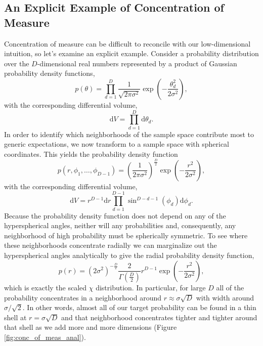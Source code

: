 \documentclass[11pt, oneside]{article}
\newcommand{\dd}{ \mathrm{d} }
\begin{document}
\subsection{An Explicit Example of Concentration of Measure}

Concentration of measure can be difficult to reconcile with our
low-dimensional intuition, so let's examine an explicit example.  Consider 
a probability distribution over the $D$-dimensional real numbers 
represented by a product of Gaussian probability density functions,
%
\begin{equation*}
p \! \left( \theta \right) = 
\prod_{d = 1}^{D} \frac{1}{\sqrt{2 \pi \sigma^{2} } }
\exp \! \left( - \frac{\theta_{d}^{2}}{2 \sigma^{2}} \right),
\end{equation*}
%
with the corresponding differential volume,
%
\begin{equation*}
\dd V = \prod_{d = 1}^{D} \dd \theta_{d}.
\end{equation*}
%
In order to identify which neighborhoods of the sample space contribute
most to generic expectations, we now transform to a sample space with 
spherical coordinates.  This yields the probability density function
%
\begin{equation*}
p \! \left( r, \phi_{1}, \ldots, \phi_{D - 1} \right) = 
\left( \frac{1}{2 \pi \sigma^{2} } \right)^{\frac{D}{2}}
\exp \! \left( - \frac{r^{2}}{2 \sigma^{2}} \right),
\end{equation*}
%
with the corresponding differential volume,
%
\begin{equation*}
\dd V = 
r^{D - 1} \dd r 
\prod_{d = 1}^{D - 1} \sin^{D - d - 1} \! \left( \phi_{d} \right) \dd \phi_{d}.
\end{equation*}
%
Because the probability density function does not depend on
any of the hyperspherical angles, neither will any probabilities
and, consequently, any neighborhood of high probability must be
spherically symmetric.  To see where these neighborhoods concentrate
radially we can marginalize out the hyperspherical angles analytically
to give the radial probability density function,
%
\begin{equation*}
p \! \left( r \right) = 
\left( 2 \sigma^{2} \right)^{-\frac{D}{2} }
\frac{ 2 }{ \Gamma \! \left( \frac{D}{2} \right) }
r^{D - 1} \exp \! \left( - \frac{r^{2}}{2 \sigma^{2}} \right),
\end{equation*}
%
which is exactly the scaled $\chi$ distribution.  In particular, for
large $D$ all of the probability concentrates in a neighborhood
around $r \approx \sigma \sqrt{D}$ with width around $\sigma / \sqrt{2}$.  
In other words, almost all of our target probability can be found in a 
thin shell at $r = \sigma \sqrt{D}$ and that neighborhood concentrates 
tighter and tighter around that shell as we add more and more dimensions 
(Figure \ref{fig:conc_of_meas_anal}).
\end{document}
